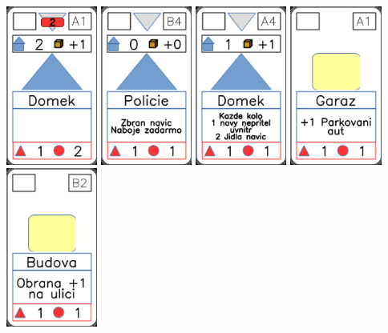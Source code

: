 \documentclass[a4paper]{article}
\begin{document}
	\includegraphics[width=3.0cm]{img-3_0}
	\includegraphics[width=3.0cm]{img-3_8}
	\includegraphics[width=3.0cm]{img-3_3}
	\includegraphics[width=3.0cm]{img-2_15}
	\includegraphics[width=3.0cm]{img-2_6}
\end{document}
